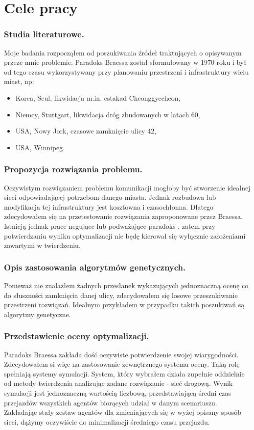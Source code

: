 \documentclass[twoside,12pt]{report}
\begin{document}
\section{Cele pracy}
\subsubsection{Studia literaturowe.}
Moje badania rozpocząłem od poszukiwania źródeł traktujących o opisywanym przeze mnie problemie. Paradoks Braessa został sformułowany w 1970 roku i był od tego czasu wykorzystywany przy planowaniu przestrzeni i infrastruktury wielu miast, np:

\begin{itemize}
\item Korea, Seul, likwidacja m.in. estakad Cheonggyecheon,
\item Niemcy, Stuttgart, likwidacja dróg zbudowanych w latach 60,
\item USA, Nowy Jork, czasowe zamknięcie ulicy 42,
\item USA, Winnipeg.\cite{urban}
\end{itemize}  

\subsubsection{Propozycja rozwiązania problemu.}
Oczywistym rozwiązaniem problemu komunikacji mogłoby być stworzenie idealnej sieci odpowiadającej potrzebom danego miasta. Jednak rozbudowa lub modyfikacja tej infrastruktury jest kosztowna i czasochłonna. Dlatego zdecydowałem się na przetestowanie rozwiązania zaproponowane przez Braessa. Istnieją jednak prace negujące lub podważające paradoks\cite{newinsights} , zatem przy potwierdzaniu wyniku optymalizacji nie będę kierował się wyłącznie założeniami zawartymi w twierdzeniu.

\subsubsection{Opis zastosowania algorytmów genetycznych.}
Ponieważ nie znalazłem żadnych przesłanek wykazujących jednoznaczną ocenę co do słuszności zamknięcia danej ulicy, zdecydowałem się losowe przeszukiwanie przestrzeni rozwiązań. Idealnym przykładem w przypadku takich poszukiwań są algorytmy genetyczne. 

\subsubsection{Przedstawienie oceny optymalizacji.}
Paradoks Braessa zakłada dość oczywiste potwierdzenie swojej wiarygodności. Zdecydowałem si więc na zastosowanie zewnętrznego systemu oceny. Taką rolę spełniają systemy symulacji. System, który wybrałem działa zupełnie oddzielnie od metody twierdzenia analizując zadane rozwiązanie - sieć drogową. Wynik symulacji jest jednoznaczną wartością liczbową, przedstawiającą średni czas przejazdów wszystkich agentów biorących udział w danym scenariuszu. Zakładając stały zestaw agentów dla zmieniających się w wyżej opisany sposób sieci, dążymy oczywiście do minimalizacji średniego czasu przejazdu.
\end{document}
